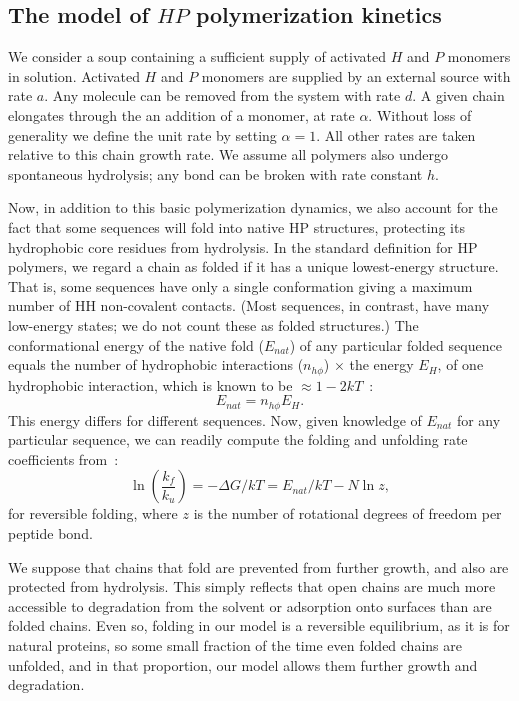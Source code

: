 \documentclass[journal=jacsat,manuscript=article,layout=twocolumn]{achemso}
\newcommand*{\ga}{\alpha}
\newcommand*{\gD}{\Delta}
\newcommand*{\pt}[1]{\left( #1\right)}
\begin{document}
\subsection{The model of $HP$ polymerization kinetics}

 We consider a soup containing a sufficient supply of activated $H$ and $P$ monomers in solution.  
 Activated $H$ and $P$ monomers are supplied by an external source with rate $a$.  Any molecule can 
be removed from the system with rate $d$.  A given chain elongates through the 
an addition of a monomer, at rate $\ga$. Without loss of 
generality we define the unit rate by setting $\ga = 1$.  All other rates are taken relative to 
this 
chain growth rate.  We assume all polymers also undergo spontaneous hydrolysis; any bond can be 
broken with rate constant $h$.  

 Now, in addition to this basic polymerization dynamics, we also account for the fact that some 
sequences 
will fold into native HP structures, protecting its hydrophobic core residues from hydrolysis.  In 
the standard definition for HP polymers, we regard a chain as folded if it has a unique 
lowest-energy structure.  That is, some sequences have only a single conformation giving a maximum 
number of HH non-covalent contacts.  (Most sequences, in contrast, 
have many low-energy states; we do not count these as folded structures.)  
The conformational energy of the native fold ($E_{nat}$) of any particular folded sequence equals 
the number of hydrophobic interactions ($n_{h\phi}$) $\times$ the energy $E_H$, of one hydrophobic 
interaction, which is known to be $\approx 1-2kT$~\cite{Ghosh2009}:
\begin{equation}
 E_{nat}=n_{h\phi}E_H.
\end{equation} 
This energy differs for different sequences.  Now, given knowledge of $E_{nat}$ for any particular 
sequence, we can readily compute the folding and unfolding rate coefficients from~\cite{Ghosh2009}:
\begin{equation}
 \ln\pt{\frac{k_f}{k_u}}=-\gD G/kT = E_{nat}/kT-N\ln z,
\end{equation} 
for reversible folding, where $z$ is the number of rotational degrees of freedom per peptide bond.  

We suppose that chains that fold are prevented from further growth, and also are protected from 
hydrolysis.  This simply reflects that open chains are much more accessible to degradation from the 
solvent or adsorption onto surfaces than are folded chains.  Even so, folding in our model is a 
reversible equilibrium, as it is for natural proteins, so some small fraction of the time even 
folded chains are unfolded, and in that proportion, our model allows them further growth and 
degradation.
 
\end{document}

